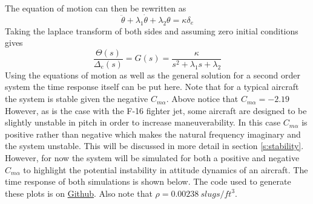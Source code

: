 The equation of motion can then be rewritten as
\begin{equation}
    \ddot{\theta} + \lambda_1 \dot{\theta} + \lambda_2 \theta = \kappa \delta_e
\end{equation}
Taking the laplace transform of both sides and assuming zero initial conditions gives
\begin{equation}
    \frac{\Theta(s)}{\Delta_e(s)} = G(s) = \frac{\kappa}{s^2 + \lambda_1 s + \lambda_2}
\end{equation}
Using the equations of motion as well as the general solution for a second order system the time response itself can be put here. Note that for a typical aircraft the system is stable given the negative $C_{m\alpha}$. Above notice that $C_{m\alpha}=-2.19$ However, as is the case with the F-16 fighter jet, some aircraft are designed to be slightly unstable in pitch in order to increase maneuverability. In this case $C_{m\alpha}$ is positive rather than negative which makes the natural frequency imaginary and the system unstable. This will be discussed in more detail in section \ref{s:stability}. However, for now the system will be simulated for both a positive and negative $C_{m\alpha}$ to highlight the potential instability in attitude dynamics of an aircraft. The time response of both simulations is shown below. The code used to generate these plots is  on \href{https://github.com/cmontalvo251/Python/blob/master/controls/pitch_dynamics_apprentice.py}{Github}. Also note that $\rho=0.00238~slugs/ft^3$.
